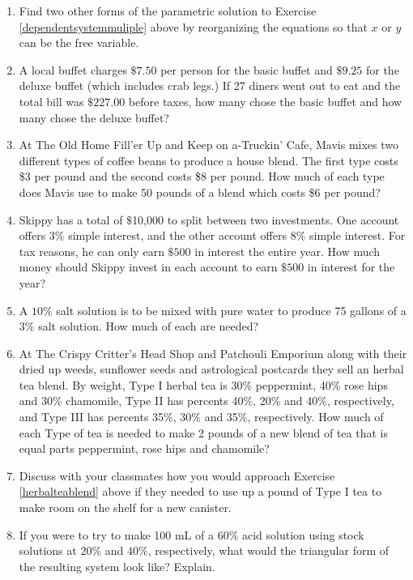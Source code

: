 \begin{enumerate}
\setcounter{enumi}{\value{HW}}

\item Find two other forms of the parametric solution to Exercise \ref{dependentsystemmuliple} above by reorganizing the equations so that $x$ or $y$ can be the free variable.

\item  A local buffet charges $\$7.50$ per person for the basic buffet and $\$9.25$ for the deluxe buffet (which includes crab legs.)  If 27 diners went out to eat and the total bill was $\$227.00$ before taxes, how many chose the basic buffet and how many chose the deluxe buffet?

\item At The Old Home Fill'er Up and Keep on a-Truckin' Cafe, Mavis mixes two different types of coffee beans to produce a house blend.   The first type costs \$3 per pound and the second costs \$8 per pound.  How much of each type does Mavis use to make 50 pounds of a blend which costs \$6 per pound?

\item  Skippy has a total of $\$$10,000 to split between two investments.  One account offers $3\%$ simple interest, and the other account offers $8\%$ simple interest.  For tax reasons, he can only earn $\$500$ in interest the entire year.  How much money should Skippy invest in each account to earn $\$500$ in interest for the year?

\item A $10 \%$ salt solution is to be mixed with pure water to produce 75 gallons of a $3\%$ salt solution.  How much of each are needed?

\item \label{herbalteablend} At The Crispy Critter's Head Shop and Patchouli Emporium along with their dried up weeds, sunflower seeds and astrological postcards they sell an herbal tea blend.  By weight, Type I herbal tea is 30\% peppermint, 40\% rose hips and 30\% chamomile, Type II has percents 40\%, 20\% and 40\%, respectively, and Type III has percents 35\%, 30\% and 35\%, respectively.  How much of each Type of tea is needed to make 2 pounds of a new blend of tea that is equal parts peppermint, rose hips and chamomile?  

\item Discuss with your classmates how you would approach Exercise \ref{herbalteablend} above if they needed to use up a pound of Type I tea to make room on the shelf for a new canister.

\item If you were to try to make 100 mL of a $60\%$ acid solution using stock solutions at $20\%$ and $40\%$, respectively, what would the triangular form of the resulting system look like?  Explain.

\end{enumerate}

